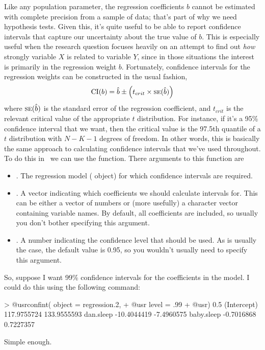 Like any population parameter, the regression coefficients $b$ cannot be estimated with complete precision from a sample of data; that's part of why we need hypothesis tests. Given this, it's quite useful to be able to report confidence intervals that capture our uncertainty about the true value of $b$. This is especially useful when the research question focuses heavily on an attempt to find out {\it how} strongly variable $X$ is related to variable $Y$, since in those situations the interest is primarily in the regression weight $b$. Fortunately, confidence intervals for the regression weights can be constructed in the usual fashion, 
$$
\mbox{CI}(b) = \hat{b} \pm \left( t_{crit} \times \SE{\hat{b}}  \right)
$$
where $\SE{\hat{b}}$ is the standard error of the regression coefficient, and $t_{crit}$ is the relevant critical value of the appropriate $t$ distribution. For instance, if it's a 95\% confidence interval that we want, then the critical value is the 97.5th quantile of a $t$ distribution with $N-K-1$ degrees of freedom.  In other words, this is basically the same approach to calculating confidence intervals that we've used throughout. To do this in \R\ we can use the  function. There arguments to this function are
\begin{itemize}
\item {}. The regression model ( object) for which confidence intervals are required.
\item {}. A vector indicating which coefficients we should calculate intervals for. This can be either a vector of numbers or (more usefully) a character vector containing variable names. By default, all coefficients are included, so usually you don't bother specifying this argument.
\item {}. A number indicating the confidence level that should be used. As is usually the case, the default value is 0.95, so you wouldn't usually need to specify this argument.
\end{itemize}
So, suppose I want 99\% confidence intervals for the coefficients in the  model. I could do this using the following command:
\begin{rblock1}
> @usr{confint( object = regression.2,}
+ @usr{         level = .99}
+ @usr{)}
                  0.5 %
(Intercept) 117.9755724 133.9555593
dan.sleep   -10.4044419  -7.4960575
baby.sleep   -0.7016868   0.7227357
\end{rblock1}
Simple enough.



